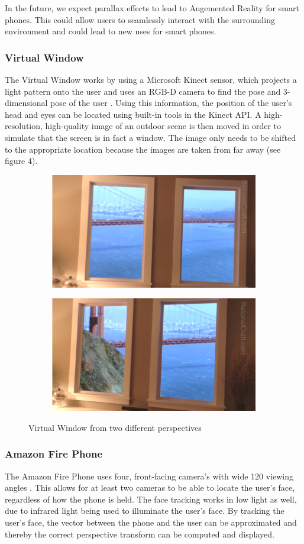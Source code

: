 \documentclass[12pt,twocolumn,letterpaper]{article}
\begin{document}
In the future, we expect parallax effects to lead to Augemented Reality for smart phones.  This could allow users to seamlessly interact with the surrounding environment and could lead to new uses for smart phones.

\subsubsection{Virtual Window}
The Virtual Window works by using a Microsoft Kinect sensor, which projects a light pattern onto the user and uses an RGB-D camera to find the pose and 3-dimensional pose of the user \cite{Winscape}.  Using this information, the position of the user's head and eyes can be located using built-in tools in the Kinect API.  A high-resolution, high-quality image of an outdoor scene is then moved in order to simulate that the screen is in fact a window.  The image only needs to be shifted to the appropriate location because the images are taken from far away (see figure 4).

\begin{figure}[!htbp]
\centering
\begin{subfigure}{0.22\textwidth}
\includegraphics[width = 35 mm]{win1.png}
\end{subfigure}
\begin{subfigure}{0.22\textwidth}
\includegraphics[width = 35 mm]{win2.png}
\end{subfigure}
\caption{Virtual Window from two different perspectives}
\end{figure}

\subsubsection{Amazon Fire Phone}
The Amazon Fire Phone uses four, front-facing camera's with wide 120 \degree viewing angles \cite{TechCrunch}.  This allows for at least two cameras to be able to locate the user's face, regardless of how the phone is held.  The face tracking works in low light as well, due to infrared light being used to illuminate the user's face.  By tracking the user's face, the vector between the phone and the user can be approximated and thereby the correct perspective transform can be computed and displayed.
\end{document}
